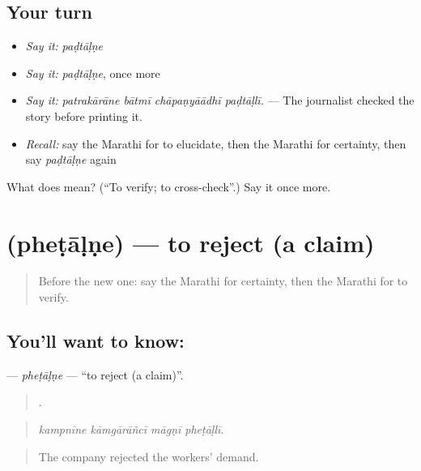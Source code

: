 \subsection*{Your turn}
\begin{itemize}
\raggedright
  \item \emph{Say it:} \emph{paḍtāḷṇe}
  \item \emph{Say it:} \emph{paḍtāḷṇe}, once more
  \item \emph{Say it:} \emph{patrakārāne bātmī chāpaṇyāādhī paḍtāḷlī.} — The journalist checked the story before printing it.
  \item \emph{Recall:} say the Marathi for to elucidate, then the Marathi for certainty, then say \emph{paḍtāḷṇe} again
\end{itemize}

\begin{tcolorbox}[breakable,colback=teal!4,colframe=teal!35!black,title={Before you move on}]
What does  mean? (\textquotedblleft{}To verify; to cross-check\textquotedblright{}.) Say it once more.
\end{tcolorbox}
\section[\texorpdfstring{\mr{फेटाळणे} (pheṭāḷṇe)}{फेटाळणे (pheṭāḷṇe)}]{ (pheṭāḷṇe) — to reject (a claim)}

\label{lesson:MR-C346-phetalne}



\begin{quote}
Before the new one: say the Marathi for certainty, then the Marathi for to verify.
\end{quote}

\subsection*{You'll want to know: }
\textbf{} — \emph{pheṭāḷṇe} — \textquotedblleft{}to reject (a claim)\textquotedblright{}.

\begin{quote}
   .
\end{quote}

\begin{quote}
\emph{kampnīne kāmgārāñcī māgṇī pheṭāḷlī.}
\end{quote}

\begin{quote}
The company rejected the workers' demand.
\end{quote}

